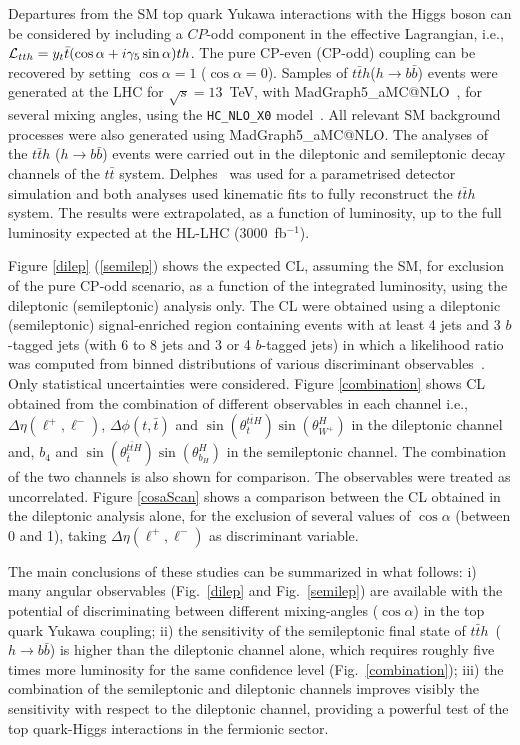 \documentclass[../report.tex]{subfiles}
\begin{document}
Departures from the SM top quark Yukawa interactions with the Higgs boson can be considered by including a $CP$-odd component in the effective Lagrangian, i.e., ${\cal L}_{tth}=y_t\bar t (\cos\alpha+i\gamma_5\sin\alpha)t h$. The pure CP-even (CP-odd) coupling can be recovered by setting $\cos\alpha=1$ ($\cos\alpha=0$). Samples of $t\bar t h$($h\rightarrow b\bar{b}$) events were generated at the LHC for $\sqrt{s}=13$~TeV, with {\sc MadGraph5\_aMC@NLO}~\cite{Alwall:2014hca}, for several mixing angles, using the \texttt{HC\_NLO\_X0} model~\cite{Artoisenet:2013puc}. All relevant SM background processes were also generated using {\sc MadGraph5\_aMC@NLO}. The analyses of the $t\bar t h$ ($h\rightarrow b\bar b$) events were carried out in the dileptonic and semileptonic decay channels of the $t\bar t$ system. Delphes~\cite{deFavereau:2013fsa} was used for a parametrised detector simulation and both analyses used kinematic fits to fully reconstruct the $t\bar t h$ system. The results were extrapolated, as a function of luminosity, up to the full luminosity expected at the HL-LHC (3000~fb$^{-1}$).

Figure \ref{dilep} (\ref{semilep}) shows the expected CL, assuming the SM, for exclusion of the pure CP-odd scenario, as a function of the integrated luminosity, using the dileptonic (semileptonic) analysis only. 
The CL were obtained using a dileptonic (semileptonic) signal-enriched region containing events with at least 4 jets and 3 $b$-tagged jets (with 6 to 8 jets and 3 or 4 $b$-tagged jets) in which a likelihood ratio was computed from binned distributions of various discriminant observables~\cite{AmorDosSantos:2017ayi,Azevedo:2017qiz,Demartin:2014fia}. 
Only statistical uncertainties were considered. Figure \ref{combination} shows CL obtained from the combination of different observables in each channel i.e., $\Delta\eta(\ell^+,\ell^-)$, $\Delta\phi(t,\bar t)$ and $\sin(\theta^{t\bar tH}_{t})\sin(\theta^{H}_{W^+})$ in the dileptonic channel and, $b_4$ and $\sin(\theta^{t\bar tH}_{\bar t})\sin(\theta^{H}_{b_H})$ in the semileptonic channel. The combination of the two channels is also shown for comparison. The observables were treated as uncorrelated. Figure \ref{cosaScan} shows a comparison between the CL obtained in the dileptonic analysis alone, for the exclusion of several values of $\cos\alpha$ (between 0 and 1), taking $\Delta\eta(\ell^+,\ell^-)$ as discriminant variable.

The main conclusions of these studies can be summarized in what follows: i) many angular observables (Fig.~\ref{dilep} and Fig.~\ref{semilep}) are available with the potential of discriminating between different mixing-angles ($\cos\alpha$) in the top quark Yukawa coupling; ii) the sensitivity of the semileptonic final state of $t\bar{t}h$~($h\rightarrow b\bar{b}$) is higher than the dileptonic channel alone, which requires roughly five times more luminosity for the same confidence level (Fig.~\ref{combination}); iii) the combination of the semileptonic and dileptonic channels improves visibly the sensitivity with respect to the dileptonic channel, providing a powerful test of the top quark-Higgs interactions in the fermionic sector.
\end{document}
